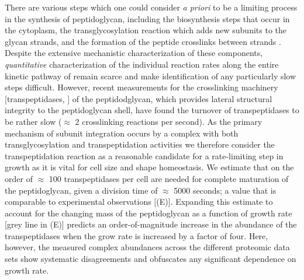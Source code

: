 There are various steps which one could consider \textit{a priori} to be a
limiting process in the synthesis of peptidoglycan, including the biosynthesis
steps that occur in the cytoplasm, the transglycosylation reaction which adds
new subunits to the glycan strands, and the formation of the peptide crosslinks
between strands \citep{shi2018,morgenstein2015,lovering2012,barreteau2008}.
Despite the extensive mechanistic characterization of these components,
\textit{quantitative} characterization of the individual reaction rates along
the entire kinetic pathway of remain scarce and make identification of any
particularly slow steps difficult. However, recent measurements for the
crosslinking machinery [transpeptidases, \cite{catherwood2020}] of the
peptidodglycan, which provides lateral structural integrity to the peptidoglycan
shell, have found the turnover of transpeptidases to be rather slow ($\approx$ 2
crosslinking reactions per second). As the primary mechanism of subunit
integration occurs by a complex with both transglycosylation and
transpeptidation activities \citep{shi2018} we therefore consider the
transpeptidation reaction as a reasonable candidate for a rate-limiting step in
growth as it is vital for cell size and shape homeostasis. We estimate that on
the order of $\approx$ 100 transpeptidases per cell are needed for complete
maturation of the peptidoglycan, given a division time of $\approx$ 5000
seconds; a value that is comparable to experimental observations
[(E)]. Expanding this estimate to account for the
changing mass of the peptidoglycan as a function of growth rate [grey line in
(E)] predicts an order-of-magnitude increase in
the abundance of the transpeptidases when the grow rate is increased by a factor
of four. Here, however, the measured complex abundances across the different
proteomic data sets show systematic disagreements and obfuscates any significant
dependence on growth rate.



